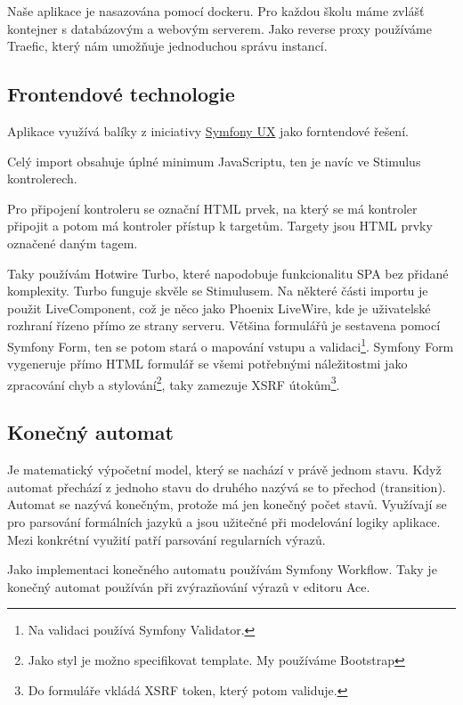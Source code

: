 Naše aplikace je nasazována pomocí dockeru. Pro každou školu máme zvlášť kontejner s databázovým a webovým serverem.
Jako reverse proxy používáme Traefic, který nám umožňuje jednoduchou správu instancí.

\subsection{Frontendové technologie}

Aplikace využívá balíky z iniciativy \href{https://ux.symfony.com/}{Symfony UX} jako forntendové řešení.

Celý import obsahuje úplné minimum JavaScriptu, ten je navíc ve Stimulus kontrolerech. 

Pro připojení kontroleru se označní HTML prvek, na který se má kontroler připojit a potom má kontroler přístup k targetům. Targety jsou HTML prvky označené daným tagem.

Taky používám Hotwire Turbo\label{ux-turbo}, které napodobuje funkcionalitu SPA bez přidané komplexity. Turbo funguje skvěle se Stimulusem.
Na některé části importu je použit LiveComponent, což je něco jako Phoenix LiveWire, kde je uživatelské rozhraní řízeno přímo ze strany serveru. 
Většina formulářů je sestavena pomocí Symfony Form, ten se potom stará o mapování vstupu a validaci\footnote{Na validaci používá Symfony Validator.}.
Symfony Form vygeneruje přímo HTML formulář se všemi potřebnými náležitostmi jako zpracování chyb a stylování\footnote{Jako styl je možno specifikovat template. My používáme Bootstrap}, taky zamezuje XSRF útokům\footnote{Do formuláře vkládá XSRF token, který potom validuje.}.

\subsection{Konečný automat}\label{uvod:konecny-automat}
Je matematický výpočetní model, který se nachází v právě jednom stavu.\cite{wiki:finite-state-machine-en}
Když automat přechází z jednoho stavu do druhého nazývá se to přechod (transition).
Automat se nazývá konečným, protože má jen konečný počet stavů.
Využívají se pro parsování formálních jazyků a jsou užitečné při modelování logiky aplikace.
Mezi konkrétní využití patří parsování regularních výrazů.\cite{wiki:finite-state-machine-cz}

Jako implementaci konečného automatu používám Symfony Workflow.
Taky je konečný automat používán při zvýrazňování výrazů v editoru Ace.


